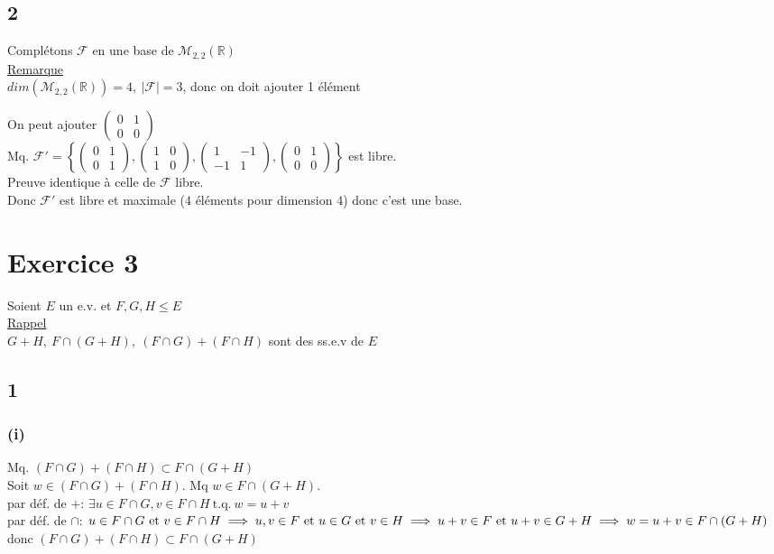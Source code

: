 \documentclass[11pt]{exam}
\newcommand{\R}{\mathbb{R}}
\newcommand{\0}{\mathbb{0}}
\begin{document}
\subsection*{2}
Complétons $\mathcal{F}$ en une base de $\mathcal{M}_{2,2}(\R)$\\
\underline{Remarque}\\
$dim(\mathcal{M}_{2,2}(\R)) = 4,\ |\mathcal{F}| = 3$, donc on doit ajouter 1 élément\\\hbox{}

On peut ajouter $\begin{pmatrix}0&1\\0&0\end{pmatrix}$\\
Mq. $\mathcal{F}' = \left\{\begin{pmatrix}0&1\\0&1\end{pmatrix}, \begin{pmatrix}1&0\\1&0\end{pmatrix}, \begin{pmatrix}1&-1\\-1&1\end{pmatrix}, \begin{pmatrix}0&1\\0&0\end{pmatrix}\right\}$ est libre.\\
Preuve identique à celle de $\mathcal{F}$ libre.\\
Donc $\mathcal{F}'$ est libre et maximale ($4$ éléments pour dimension $4$) donc c'est une base.

\section*{Exercice 3}
Soient $E$ un e.v. et $F,G,H \leq E$\\
\underline{Rappel}\\
$G+H,\ F\cap(G+H),\ (F\cap G) + (F\cap H)$ sont des ss.e.v de $E$\\\hbox{}

\subsection*{1}
\subsubsection*{(i)}
Mq. $(F\cap G) + (F\cap H) \subset F\cap(G+H)$\\
Soit $w \in (F\cap G) + (F\cap H)$. Mq $w \in F\cap(G+H)$.\\
par déf. de $+$: $\exists u\in F\cap G,v\in F\cap H\ \text{t.q.}\ w = u+v$\\
par déf. de $\cap$: $u\in F\cap G\ \text{et}\ v\in F\cap H \implies u,v \in F\ \text{et}\ u\in G\ \text{et}\ v\in H\\\implies u+v \in F \ \text{et}\ u+v \in G+H\\\implies w = u+v \in F\cap(G+H)$\\
donc $(F\cap G) + (F\cap H) \subset F\cap(G+H)$
\end{document}
